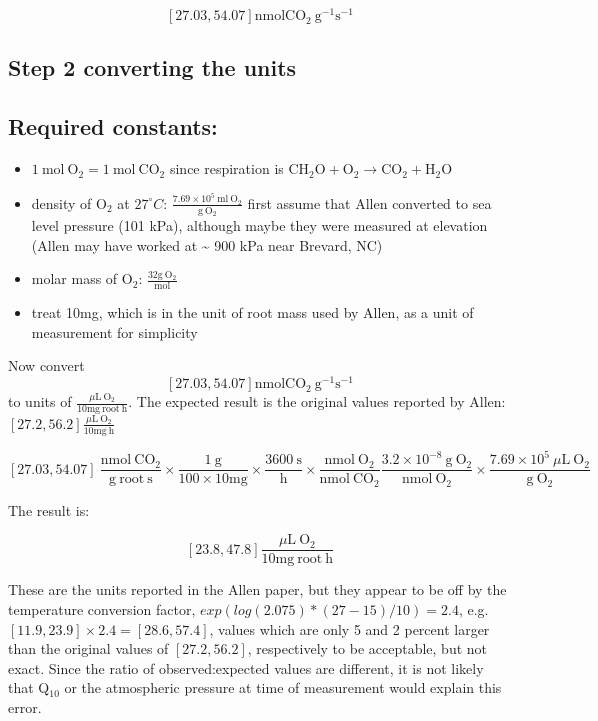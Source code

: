 \documentclass[12pt,english,portrait]{article}
\begin{document}
$$[27.03,54.07] \mathrm{nmol CO}_2\ \mathrm{g}^{-1}\mathrm{s}^{-1}$$ 

\subsection{Step 2 converting the units}


\subsection{Required constants:}
\begin{itemize}
\item $1\ \mathrm{mol}\ \mathrm{O}_2 = 1\ \mathrm{mol}\ \mathrm{CO}_2$ since respiration is
  $\mathrm{CH}_2\mathrm{O} + \mathrm{O}_2 \to \mathrm{CO}_2 + \mathrm{H}_2\mathrm{O}$
\item density of $\mathrm{O}_2$ at $27^\circ C$: $\frac{7.69 \times 10^5\ \mathrm{ml}\ \mathrm{O}_2}{\mathrm{g}\ \mathrm{O}_2}$ first assume that Allen converted to sea level pressure (101 kPa), although  maybe they were measured at elevation (Allen may have worked at \~{} 900 kPa near Brevard, NC)
\item molar mass of $\mathrm{O}_2$: $\frac{32\mathrm{g}\ \mathrm{O}_2}{\mathrm{mol}}$
\item treat 10mg, which is in the unit of root mass used by Allen, as a unit of measurement for simplicity 
\end{itemize}

Now convert $$[27.03,54.07] \mathrm{nmol CO}_2\ \mathrm{g}^{-1}\mathrm{s}^{-1}$$ to units of $\frac{\mu\mathrm{L}\ \textrm{O}_2}{10\mathrm{mg}\ \mathrm{root}\ \mathrm{h}}$.
The expected result is the original values reported by Allen: $[27.2, 56.2] \frac{\mu\mathrm{L}\ \mathrm{O}_2}{10\mathrm{mg}\ \mathrm{h}}$

$$[27.03, 54.07]\ \frac{\mathrm{nmol}\ \mathrm{CO}_2}{\mathrm{g}\ \mathrm{root}\ \mathrm{s}} \times \frac{1\ \mathrm{g}}{100\times10\mathrm{mg}} \times \frac{3600\ \mathrm{s}}{\mathrm{h}} \times \frac{\mathrm{nmol}\ \mathrm{O}_2}{\mathrm{nmol}\ \mathrm{CO}_2}\frac{3.2 \times 10^{-8}\ \mathrm{g}\ \mathrm{O}_2}{\mathrm{nmol}\ \mathrm{O}_2}\times \frac{7.69\times10^5\ \mu\mathrm{L}\ \mathrm{O}_2}{\mathrm{g}\ \mathrm{O}_2}$$

The result is: 

$$[23.8, 47.8]  \frac{\mu\mathrm{L}\ \textrm{O}_2}{10\mathrm{mg}\ \mathrm{root}\ \mathrm{h}}$$

These are the units reported in the Allen paper, but they appear to be off by the temperature conversion factor, $exp(log(2.075)*(27 - 15)/10)=2.4$, e.g. $[11.9, 23.9]\times 2.4= [28.6,57.4]$, values which are only 5 and 2 percent larger than the original values of $[27.2, 56.2]$, respectively to be acceptable, but not exact. Since the ratio of observed:expected values are different, it is not likely that Q$_{10}$ or the atmospheric pressure at time of measurement would explain this error.  
\end{document}
